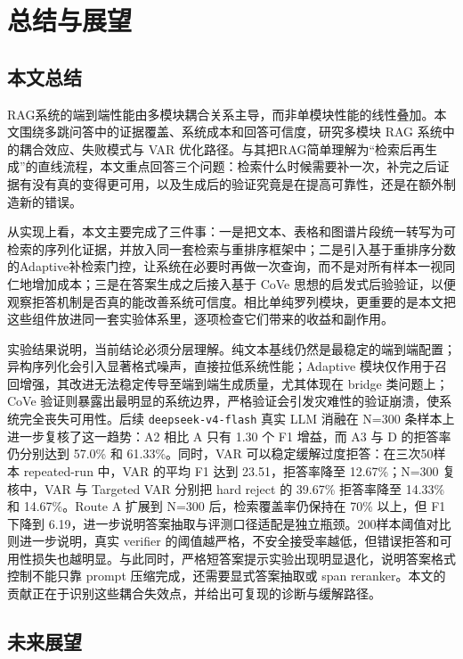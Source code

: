 \cleardoublepage

\section{总结与展望}

\subsection{本文总结}

RAG系统的端到端性能由多模块耦合关系主导，而非单模块性能的线性叠加。本文围绕多跳问答中的证据覆盖、系统成本和回答可信度，研究多模块 RAG 系统中的耦合效应、失败模式与 VAR 优化路径。与其把RAG简单理解为“检索后再生成”的直线流程，本文重点回答三个问题：检索什么时候需要补一次，补完之后证据有没有真的变得更可用，以及生成后的验证究竟是在提高可靠性，还是在额外制造新的错误。

从实现上看，本文主要完成了三件事：一是把文本、表格和图谱片段统一转写为可检索的序列化证据，并放入同一套检索与重排序框架中；二是引入基于重排序分数的Adaptive补检索门控，让系统在必要时再做一次查询，而不是对所有样本一视同仁地增加成本；三是在答案生成之后接入基于 CoVe 思想的启发式后验验证，以便观察拒答机制是否真的能改善系统可信度。相比单纯罗列模块，更重要的是本文把这些组件放进同一套实验体系里，逐项检查它们带来的收益和副作用。

实验结果说明，当前结论必须分层理解。纯文本基线仍然是最稳定的端到端配置；异构序列化会引入显著格式噪声，直接拉低系统性能；Adaptive 模块仅作用于召回增强，其改进无法稳定传导至端到端生成质量，尤其体现在 bridge 类问题上；CoVe 验证则暴露出最明显的系统边界，严格验证会引发灾难性的验证崩溃，使系统完全丧失可用性。后续 \texttt{deepseek-v4-flash} 真实 LLM 消融在 N=300 条样本上进一步复核了这一趋势：A2 相比 A 只有 1.30 个 F1 增益，而 A3 与 D 的拒答率仍分别达到 57.0\% 和 61.33\%。同时，VAR 可以稳定缓解过度拒答：在三次50样本 repeated-run 中，VAR 的平均 F1 达到 23.51，拒答率降至 12.67\%；N=300 复核中，VAR 与 Targeted VAR 分别把 hard reject 的 39.67\% 拒答率降至 14.33\% 和 14.67\%。Route A 扩展到 N=300 后，检索覆盖率仍保持在 70\% 以上，但 F1 下降到 6.19，进一步说明答案抽取与评测口径适配是独立瓶颈。200样本阈值对比则进一步说明，真实 verifier 的阈值越严格，不安全接受率越低，但错误拒答和可用性损失也越明显。与此同时，严格短答案提示实验出现明显退化，说明答案格式控制不能只靠 prompt 压缩完成，还需要显式答案抽取或 span reranker。本文的贡献正在于识别这些耦合失效点，并给出可复现的诊断与缓解路径。

\subsection{未来展望}

